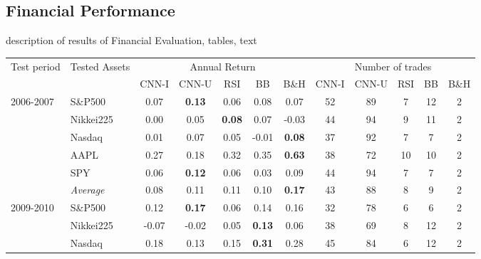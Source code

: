 \documentclass[11pt, a4paper]{article}
\begin{document}
\subsection{Financial Performance}
\label{subsec:ER:FinPerf}
description of results of Financial Evaluation, tables, text

\begin{table}[H]
\begin{tabular}{l|l|ccccc|ccccc}
\multicolumn{1}{m{1cm}|}{\multirow{2}{1cm}{Test period}} & \multicolumn{1}{m{1.5cm}|}{\multirow{2}{1.5cm}{Tested Assets}} &       \multicolumn{5}{c|}{Annual Return} & \multicolumn{5}{c}{Number of trades} \\ \cline{3-12}
  &                  &  CNN-I         & CNN-U         & RSI           & BB            & B\&H          & CNN-I            & CNN-U & RSI & BB & B\&H \\ \hline \hline
\multirow{6}{1cm}{2006-2007} & S\&P500       & 0.07          & \textbf{0.13} & 0.06          & 0.08          & 0.07          & 52               & 89    & 7   & 12 & 2    \\
  & Nikkei225        &  0.00          & 0.05          & \textbf{0.08} & 0.07          & -0.03         & 44               & 94    & 9   & 11 & 2    \\
  & Nasdaq       & 0.01          & 0.07          & 0.05          & -0.01         & \textbf{0.08} & 37               & 92    & 7   & 7  & 2    \\
  & AAPL             & 0.27          & 0.18          & 0.32          & 0.35          & \textbf{0.63} & 38               & 72    & 10  & 10 & 2    \\
  & SPY              & 0.06          & \textbf{0.12} & 0.06          & 0.03          & 0.09          & 44               & 94    & 7   & 7  & 2    \\ \cline{2-12}
  & \textit{Average}  & 0.08          & 0.11          & 0.11          & 0.10          & \textbf{0.17} & 43               & 88    & 8   & 9  & 2    \\ \hline
\multirow{6}{1cm}{2009-2010} & S\&P500    & 0.12          & \textbf{0.17} & 0.06          & 0.14          & 0.16          & 32               & 78    & 6   & 6  & 2    \\
  & Nikkei225    & -0.07         & -0.02         & 0.05          & \textbf{0.13} & 0.06          & 38               & 69    & 8   & 12 & 2    \\
  & Nasdaq       & 0.18          & 0.13          & 0.15          & \textbf{0.31} & 0.28          & 45               & 84    & 6   & 12 & 2    \\

\end{tabular}
\end{table}
\end{document}
